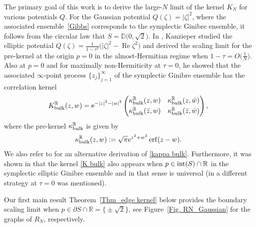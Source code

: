 \documentclass[pdftex]{sigma}
\numberwithin{equation}{section}
\newcommand{\erf}{\operatorname{erf}}
\newcommand{\R}{{\mathbb R}}
\newcommand{\re}{\operatorname{Re}}
\newcommand{\1}{\chi}
\begin{document}
The primary goal of this work is to derive the large-$N$ limit of the kernel $K_N$ for various potentials $Q$.
For the Gaussian potential $Q(\zeta)=|\zeta|^2$, where the associated ensemble~\eqref{Gibbs} corresponds to the symplectic Ginibre ensemble, it follows from the circular law that $S=\mathbb{D}\big(0,\sqrt{2}\big)$.
In \cite{MR1928853}, Kanzieper studied the elliptic potential $Q(\zeta)=\frac{1}{1-\tau^2}\big(|\zeta|^2-\re\zeta^2\big)$ and derived the scaling limit
for the pre-kernel at the origin $p=0$ in the almost-Hermitian regime when $1-\tau=O\big(\frac{1}{N}\big)$.
Also at $p=0$ and for maximally non-Hermiticity at $\tau=0$,
he showed that the associated $\infty$-point process $\{z_j\}_{j=1}^\infty$
of the symplectic Ginibre ensemble has the correlation kernel
\begin{gather} \label{K bulk}
	K_{{\rm bulk}}^\R(z,w)= {\rm e}^{-|z|^2-|w|^2}
	\begin{pmatrix}
		\kappa_{{\rm bulk}}^\R(z,w) & \kappa_{{\rm bulk}}^\R(z,\bar{w})
		\vspace{1mm}\\
		\kappa_{{\rm bulk}}^\R(\bar{z},w) & \kappa_{{\rm bulk}}^\R(\bar{z},\bar{w})
	\end{pmatrix},
\end{gather}
where the pre-kernel $\kappa_{{\rm bulk}}^\R$ is given by
\begin{gather} \label{kappa bulk}
	\kappa_{{\rm bulk}}^\R(z,w):= \sqrt{\pi} {\rm e}^{ z^2+w^2 } \erf (z-w).
\end{gather}
We also refer to \cite{Mehta} for an alternative derivation of \eqref{kappa bulk}.
Furthermore, it was shown in \cite{BE,BL2} that the kernel \eqref{K bulk} also appears when $p \in \textup{int}(S) \cap \R$
in the symplectic elliptic Ginibre ensemble
and in that sense is universal
(in \cite[Appendix B]{akemann2019universal} a different strategy at $\tau=0$ was mentioned).

Our first main result Theorem~\ref{Thm_edge kernel} below provides the boundary scaling limit when $p \in \partial S \cap \R=\big\{ {\pm} \sqrt{2} \big\}$, see Figure~\ref{Fig. RN_Gaussian} for the graphs of $R_N$, respectively.
\end{document}
